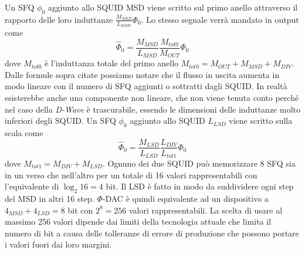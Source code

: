 Un SFQ $\phi_0$ aggiunto allo SQUID MSD viene scritto sul primo anello attraverso il rapporto delle loro induttanze $\frac{M_{MSD}}{L_{MSD}}\Phi_0$.
Lo stesso segnale verrà mandato in output come
$$\hat{\Phi}_0 = \frac{M_{MSD}}{L_{MSD}}\frac{M_{tot0}}{M_{OUT}}\Phi_0$$
dove $M_{tot0}$ è l'induttanza totale del primo anello $M_{tot0} = M_{OUT} + M_{MSD} + M_{DIV}$. Dalle formule sopra citate possiamo notare che il flusso in uscita aumenta in modo lineare con il numero di SFQ aggiunti o sottratti dagli SQUID. In realtà esisterebbe anche una componente non lineare, che non viene tenuta conto perché nel caso della \textit{D-Wave} è trascurabile, essendo le dimensioni delle induttanze molto inferiori degli SQUID.
Un SFQ $\phi_0$ aggiunto allo SQUID $L_{LSD}$ viene scritto sulla scala come
$$\hat{\Phi}_0 = \frac{M_{LSD}}{L_{LSD}}\frac{L_{DIV}}{L_{tot1}}\Phi_0$$
dove $M_{tot1} = M_{DIV} + M_{LSD}$. Ognuno dei due SQUID può memorizzare 8 SFQ sia in un verso che nell'altro per un totale di 16 valori rappresentabili con l'equivalente di $\log_2{16} = 4$ bit. Il LSD è fatto in modo da suddividere ogni step del MSD in altri 16 step. $\Phi$-DAC è quindi equivalente ad un dispositivo a $4_{MSD} + 4_{LSD} = 8$ bit con $2^8 = 256$ valori rappresentabili.
La scelta di usare al massimo 256 valori dipende dai limiti della tecnologia attuale che limita il numero di bit a causa delle tolleranze di errore di produzione che possono portare i valori fuori dai loro margini.

